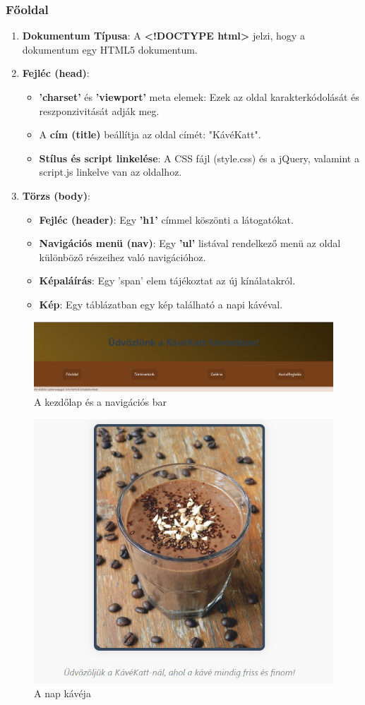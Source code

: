 \documentclass{article}
\begin{document}
\subsubsection{Főoldal}
\begin{enumerate}
	\item \textbf{Dokumentum Típusa}: A \textbf{<!DOCTYPE html>} jelzi, hogy a dokumentum egy HTML5 dokumentum.
	\item \textbf{Fejléc (head)}:
		\begin{itemize}
			\item \textbf{'charset'} és \textbf{'viewport'} meta elemek: Ezek az oldal karakterkódolását és reszponzivitását adják meg.
			\item A \textbf{cím (title)} beállítja az oldal címét: "KávéKatt".
			\item \textbf{Stílus és script linkelése}: A CSS fájl (style.css) és a jQuery, valamint a script.js linkelve van az oldalhoz.
		\end{itemize}
	\item \textbf{Törzs (body)}:
		\begin{itemize}
			\item \textbf{Fejléc (header)}: Egy \textbf{'h1'} címmel köszönti a látogatókat.
			\item \textbf{Navigációs menü (nav)}: Egy \textbf{'ul'} listával rendelkező menü az oldal különböző részeihez való navigációhoz.
			\item \textbf{Képaláírás}: Egy 'span' elem tájékoztat az új kínálatakról.
			\item \textbf{Kép}: Egy táblázatban egy kép található a napi kávéval.
		\end{itemize}
\end{enumerate}
\begin{figure}[H]
	\centering
	\includegraphics[width=0.9\linewidth]{kvkatt.png}
	\caption{A kezdőlap és a navigációs bar}
	\label{fig:index}
\end{figure}
\begin{figure}[H]
	\centering
	\includegraphics[width=0.6\linewidth]{kv.png}
	\caption{A nap kávéja}
	\label{fig:indexkv}
\end{figure}
\end{document}
